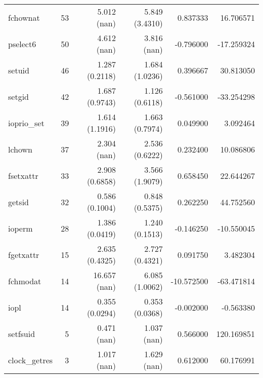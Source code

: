 \begin{longtable}{>{\ttfamily}lrrrrr}
                       fchownat &          53 &              5.012 (nan) &           5.849 (3.4310) &        0.837333 &    16.706571 \\
                       pselect6 &          50 &              4.612 (nan) &              3.816 (nan) &       -0.796000 &   -17.259324 \\
                         setuid &          46 &           1.287 (0.2118) &           1.684 (1.0236) &        0.396667 &    30.813050 \\
                         setgid &          42 &           1.687 (0.9743) &           1.126 (0.6118) &       -0.561000 &   -33.254298 \\
                    ioprio\_set &          39 &           1.614 (1.1916) &           1.663 (0.7974) &        0.049900 &     3.092464 \\
                         lchown &          37 &              2.304 (nan) &           2.536 (0.6222) &        0.232400 &    10.086806 \\
                      fsetxattr &          33 &           2.908 (0.6858) &           3.566 (1.9079) &        0.658450 &    22.644267 \\
                         getsid &          32 &           0.586 (0.1004) &           0.848 (0.5375) &        0.262250 &    44.752560 \\
                         ioperm &          28 &           1.386 (0.0419) &           1.240 (0.1513) &       -0.146250 &   -10.550045 \\
                      fgetxattr &          15 &           2.635 (0.4325) &           2.727 (0.4321) &        0.091750 &     3.482304 \\
                       fchmodat &          14 &             16.657 (nan) &           6.085 (1.0062) &      -10.572500 &   -63.471814 \\
                           iopl &          14 &           0.355 (0.0294) &           0.353 (0.0368) &       -0.002000 &    -0.563380 \\
                       setfsuid &           5 &              0.471 (nan) &              1.037 (nan) &        0.566000 &   120.169851 \\
                  clock\_getres &           3 &              1.017 (nan) &              1.629 (nan) &        0.612000 &    60.176991 \\
\end{longtable}
